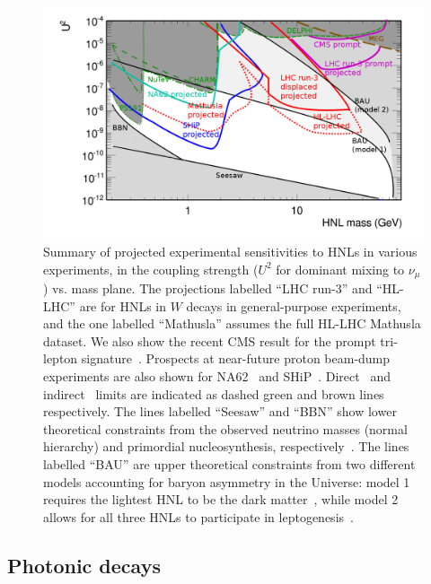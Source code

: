 \begin{figure}[t]
\centering
\includegraphics[width=0.99\linewidth]{plots/BigPicture.png}
\caption{Summary of projected experimental sensitivities to HNLs in various experiments, in the coupling strength ($U^2$ for dominant mixing to $\nu_\mu$) vs. mass plane. The projections labelled ``LHC run-3'' and ``HL-LHC'' are for HNLs in $W$ decays in general-purpose experiments, and the one labelled ``Mathusla'' assumes the full HL-LHC Mathusla dataset. We also show the recent CMS result for the prompt tri-lepton signature~\cite{Sirunyan:2018mtv}. Prospects at near-future proton beam-dump experiments are also shown for NA62~\cite{Lanfranchi2017} and SHiP~\cite{SHiP2015}. Direct~\cite{Bernardi1988,CHARM1986,NuTeV1999,Delphi1997,CMS2015b} and indirect~\cite{MEG2013,Antusch2015} limits are indicated as dashed green and brown lines respectively. The lines labelled ``Seesaw'' and ``BBN'' show lower theoretical constraints from the observed neutrino masses (normal hierarchy) and primordial nucleosynthesis, respectively~\cite{Canetti2013b}. The lines labelled ``BAU'' are upper theoretical constraints from two different models accounting for baryon asymmetry in the Universe: model 1 requires the lightest HNL to be the dark matter~\cite{Canetti2013b}, while model 2 allows for all three HNLs to participate in leptogenesis~\cite{Canetti2014}. }
\label{fig:HNLsensitivity}
\end{figure}

\subsection{Photonic decays}
\label{subsec:dphotons}

